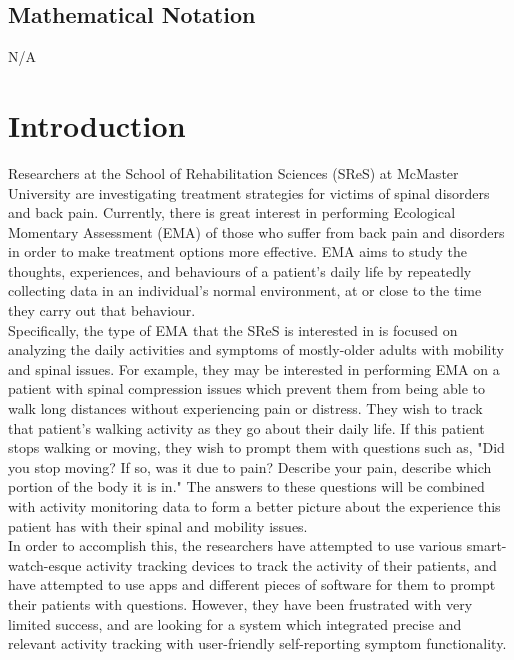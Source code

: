 \documentclass[12pt]{article}
\begin{document}
\subsection{Mathematical Notation}
N/A


\section{Introduction}

Researchers at the School of Rehabilitation Sciences (SReS) at McMaster University are investigating treatment strategies for victims of spinal disorders and back pain. Currently, there is great interest in performing Ecological Momentary Assessment (EMA) of those who suffer from back pain and disorders in order to make treatment options more effective. EMA aims to study the thoughts, experiences, and behaviours of a patient's daily life by repeatedly collecting data in an individual's normal environment, at or close to the time they carry out that behaviour.\\

Specifically, the type of EMA that the SReS is interested in is focused on analyzing the daily activities and symptoms of mostly-older adults with mobility and spinal issues. For example, they may be interested in performing EMA on a patient with spinal compression issues which prevent them from being able to walk long distances without experiencing pain or distress. They wish to track that patient's walking activity as they go about their daily life. If this patient stops walking or moving, they wish to prompt them with questions such as, "Did you stop moving? If so, was it due to pain? Describe your pain, describe which portion of the body it is in." The answers to these questions will be combined with activity monitoring data to form a better picture about the experience this patient has with their spinal and mobility issues.\\

In order to accomplish this, the researchers have attempted to use various smart-watch-esque activity tracking devices to track the activity of their patients, and have attempted to use apps and different pieces of software for them to prompt their patients with questions. However, they have been frustrated with very limited success, and are looking for a system which integrated precise and relevant activity tracking with user-friendly self-reporting symptom functionality.\\
\end{document}

